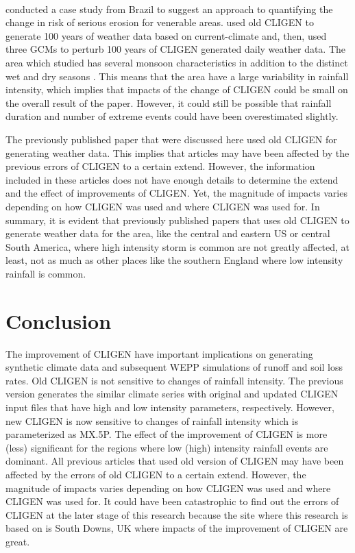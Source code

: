 \paragraph{\citet{favis-mortlock1999-329}} conducted a case study from Brazil to
suggest an
approach to quantifying the change in risk of serious erosion for venerable
areas. \citet{favis-mortlock1999-329} used old CLIGEN to generate 100 years of
weather data based on current-climate and, then, used three GCMs to perturb 100
years of CLIGEN generated daily weather data. The area which
\citet{favis-mortlock1999-329} studied has several monsoon characteristics in
addition to the distinct wet and dry seasons \citep{gan2004-47}. This means
that the area have a large variability in rainfall intensity, which implies
that impacts of the change of CLIGEN could be small on the overall result of the
paper. However, it could still be possible that rainfall duration and number of
extreme events could have been overestimated slightly.

The previously published paper that were discussed here used old CLIGEN for
generating weather data. This implies that articles may have been affected by
the previous errors of CLIGEN to a certain extend. However, the information
included in these articles does not have enough details to determine the extend
and the effect of improvements of CLIGEN. Yet, the magnitude of impacts varies
depending on how CLIGEN was used and where CLIGEN was used for. In summary,
it is evident that previously published papers that uses old CLIGEN to
generate weather data for the area, like the central and eastern US or central
South America, where high intensity storm is common are not greatly affected,
at least, not as much as other places like the southern England where low
intensity rainfall is common.

\section{Conclusion}
\label{sec:ImprovedCLIGENConclusion}
The improvement of CLIGEN have important implications on generating synthetic
climate data and subsequent WEPP simulations of runoff and soil loss rates. Old
CLIGEN is not sensitive to changes of rainfall intensity. The previous version
generates the similar climate series with original and updated CLIGEN input
files that have high and low intensity parameters, respectively. However, new
CLIGEN is now sensitive to changes of rainfall intensity which is parameterized
as {MX.5P}. The effect of the improvement of CLIGEN is more (less) significant
for the regions where low (high) intensity rainfall events are dominant.
All previous articles that used old version of CLIGEN may have been affected by
the errors of old CLIGEN to a certain extend. However, the magnitude of impacts
varies depending on how CLIGEN was used and where CLIGEN was used for. It could
have been catastrophic to find out the errors of CLIGEN at the later stage of
this research because the site where this research is based on is South Downs,
UK where impacts of the improvement of CLIGEN are great.


